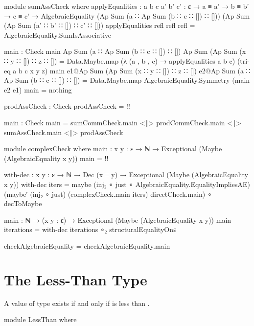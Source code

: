\documentclass{report}
\begin{document}
\begin{code}
      module sumAssCheck where
        applyEqualities :
          {a b c a' b' c' : ε} →
          a ≡ a' →
          b ≡ b' →
          c ≡ c' →
          AlgebraicEquality (Ap Sum (a ∷ Ap Sum (b ∷ c ∷ []) ∷ []))
                            (Ap Sum (Ap Sum (a' ∷ b' ∷ []) ∷ c' ∷ []))
        applyEqualities refl refl refl = AlgebraicEquality.SumIsAssociative

        main : Check
        main {Ap Sum (a ∷ Ap Sum (b ∷ c ∷ []) ∷ [])}
             {Ap Sum (Ap Sum (x ∷ y ∷ []) ∷ z ∷ [])} =
             Data.Maybe.map (λ (a , b , c) → applyEqualities a b c)
                            (tri-eq {a} {b} {c} {x} {y} {z})
        main e1@{Ap Sum (Ap Sum (x ∷ y ∷ []) ∷ z ∷ [])}
             e2@{Ap Sum (a ∷ Ap Sum (b ∷ c ∷ []) ∷ [])} =
               Data.Maybe.map AlgebraicEquality.Symmetry (main {e2} {e1})
        main = nothing

      prodAssCheck : Check
      prodAssCheck = {!!}

      main : Check
      main =   sumCommCheck.main
           <∣> prodCommCheck.main
           <∣> sumAssCheck.main
           <∣> prodAssCheck

    module complexCheck where
      main : {x y : ε} → ℕ → Exceptional (Maybe (AlgebraicEquality x y))
      main = {!!}

    with-dec : {x y : ε} →
               ℕ →
               Dec (x ≡ y) →
               Exceptional (Maybe (AlgebraicEquality x y))
    with-dec iters = maybe (inj₂ ∘ just ∘ AlgebraicEquality.EqualityImpliesAE)
                           (maybe′ (inj₂ ∘ just)
                                   (complexCheck.main iters)
                                   directCheck.main)
                   ∘ decToMaybe

    main : ℕ → (x y : ε) → Exceptional (Maybe (AlgebraicEquality x y))
    main iterations = with-dec iterations ∘₂ structuralEqualityOnε

  checkAlgebraicEquality = checkAlgebraicEquality.main
\end{code}

\chapter{The Less-Than Type}
A value of type    exists if and only if  is less than .

\begin{code}
  module LessThan where
\end{code}
\end{document}
